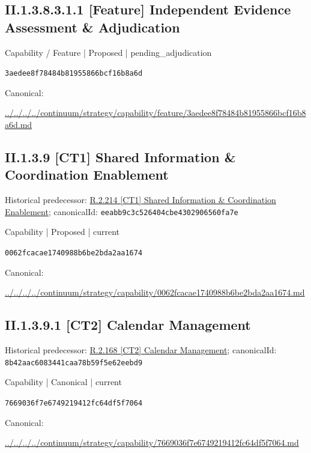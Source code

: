 \documentclass[10pt,a4paper]{article}
\begin{document}
\subsection*{II.1.3.8.3.1.1 [Feature] Independent Evidence Assessment \& Adjudication}
\label{element-3aedee8f78484b81955866bcf16b8a6d}
{\small Capability / Feature | Proposed | pending\_adjudication}\par
\texttt{3aedee8f78484b81955866bcf16b8a6d}\par
Canonical: \par
{\footnotesize\url{../../../../continuum/strategy/capability/feature/3aedee8f78484b81955866bcf16b8a6d.md}}\par
\subsection*{II.1.3.9 [CT1] Shared Information \& Coordination Enablement}
Historical predecessor: \hyperref[element-eeabb9c3c526404cbe4302906560fa7e]{R.2.214 [CT1] Shared Information \& Coordination Enablement}; canonicalId: \texttt{eeabb9c3c526404cbe4302906560fa7e}\par
\label{element-0062fcacae1740988b6be2bda2aa1674}
{\small Capability | Proposed | current}\par
\texttt{0062fcacae1740988b6be2bda2aa1674}\par
Canonical: \par
{\footnotesize\url{../../../../continuum/strategy/capability/0062fcacae1740988b6be2bda2aa1674.md}}\par
\subsection*{II.1.3.9.1 [CT2] Calendar Management}
Historical predecessor: \hyperref[element-8b42aac6083441caa78b59f5e62eebd9]{R.2.168 [CT2] Calendar Management}; canonicalId: \texttt{8b42aac6083441caa78b59f5e62eebd9}\par
\label{element-7669036f7e6749219412fc64df5f7064}
{\small Capability | Canonical | current}\par
\texttt{7669036f7e6749219412fc64df5f7064}\par
Canonical: \par
{\footnotesize\url{../../../../continuum/strategy/capability/7669036f7e6749219412fc64df5f7064.md}}\par
\end{document}
